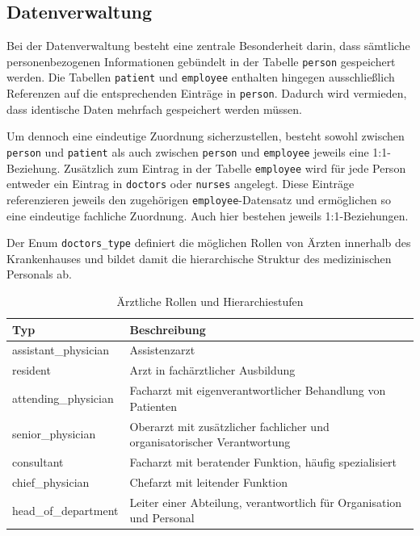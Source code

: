 \subsection*{Datenverwaltung}
Bei der Datenverwaltung besteht eine zentrale Besonderheit darin, dass sämtliche personenbezogenen Informationen gebündelt in der Tabelle \texttt{person} gespeichert werden.
Die Tabellen \texttt{patient} und \texttt{employee} enthalten hingegen ausschließlich Referenzen auf die entsprechenden Einträge in \texttt{person}. Dadurch wird vermieden, dass identische Daten mehrfach gespeichert werden müssen.

Um dennoch eine eindeutige Zuordnung sicherzustellen, besteht sowohl zwischen \texttt{person} und \texttt{patient} als auch zwischen \texttt{person} und \texttt{employee} jeweils eine 1:1-Beziehung.
Zusätzlich zum Eintrag in der Tabelle \texttt{employee} wird für jede Person entweder ein Eintrag in \texttt{doctors} oder \texttt{nurses} angelegt. Diese Einträge referenzieren jeweils den zugehörigen \texttt{employee}-Datensatz und ermöglichen so eine eindeutige fachliche Zuordnung. Auch hier bestehen jeweils 1:1-Beziehungen.

Der Enum \texttt{doctors\_type} definiert die möglichen Rollen von Ärzten innerhalb des Krankenhauses und bildet damit die hierarchische Struktur des medizinischen Personals ab.

\newpage

\begin{table}[h]
\centering
\renewcommand{\arraystretch}{1.4}
\begin{tabularx}{\textwidth}{|l|X|}
\hline
\textbf{Typ} & \textbf{Beschreibung} \\
\hline
assistant\_physician & Assistenzarzt \\
\hline
resident & Arzt in fachärztlicher Ausbildung \\
\hline
attending\_physician & Facharzt mit eigenverantwortlicher Behandlung von Patienten \\
\hline
senior\_physician & Oberarzt mit zusätzlicher fachlicher und organisatorischer Verantwortung \\
\hline
consultant & Facharzt mit beratender Funktion, häufig spezialisiert \\
\hline
chief\_physician & Chefarzt mit leitender Funktion \\
\hline
head\_of\_department & Leiter einer Abteilung, verantwortlich für Organisation und Personal \\
\hline
\end{tabularx}
\caption{Ärztliche Rollen und Hierarchiestufen}
\end{table}

